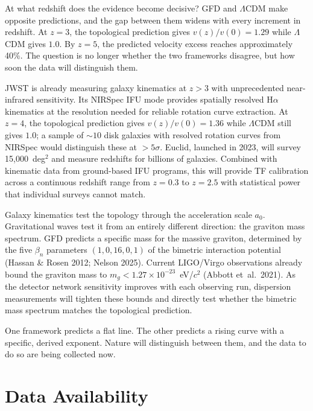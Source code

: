\documentclass[aps,prd,preprint,superscriptaddress,showpacs,preprintnumbers,amsmath,amssymb,nofootinbib]{revtex4-2}
\begin{document}
At what redshift does the evidence become decisive? GFD and $\Lambda$CDM make opposite predictions, and the gap between them widens with every increment in redshift. At $z = 3$, the topological prediction gives $v(z)/v(0) = 1.29$ while $\Lambda$CDM gives $1.0$. By $z = 5$, the predicted velocity excess reaches approximately 40\%. The question is no longer whether the two frameworks disagree, but how soon the data will distinguish them.

JWST is already measuring galaxy kinematics at $z > 3$ with unprecedented near-infrared sensitivity. Its NIRSpec IFU mode provides spatially resolved H$\alpha$ kinematics at the resolution needed for reliable rotation curve extraction. At $z = 4$, the topological prediction gives $v(z)/v(0) = 1.36$ while $\Lambda$CDM still gives $1.0$; a sample of $\sim 10$ disk galaxies with resolved rotation curves from NIRSpec would distinguish these at $> 5\sigma$. Euclid, launched in 2023, will survey 15,000~deg$^2$ and measure redshifts for billions of galaxies. Combined with kinematic data from ground-based IFU programs, this will provide TF calibration across a continuous redshift range from $z = 0.3$ to $z = 2.5$ with statistical power that individual surveys cannot match.

Galaxy kinematics test the topology through the acceleration scale $a_0$. Gravitational waves test it from an entirely different direction: the graviton mass spectrum. GFD predicts a specific mass for the massive graviton, determined by the five $\beta_n$ parameters $(1, 0, 16, 0, 1)$ of the bimetric interaction potential (Hassan \& Rosen 2012; Nelson 2025). Current LIGO/Virgo observations already bound the graviton mass to $m_g < 1.27 \times 10^{-23}$~eV/$c^2$ (Abbott et~al.\ 2021). As the detector network sensitivity improves with each observing run, dispersion measurements will tighten these bounds and directly test whether the bimetric mass spectrum matches the topological prediction.

One framework predicts a flat line. The other predicts a rising curve with a specific, derived exponent. Nature will distinguish between them, and the data to do so are being collected now.

\section*{Data Availability}
\end{document}

